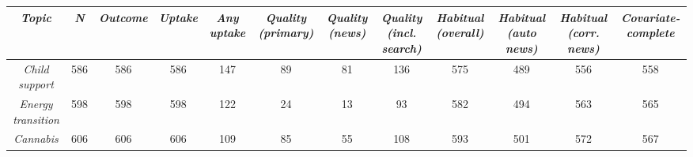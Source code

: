 \begin{tabular}{c c c c c c c c c c c c}
      \hline
      \textit{Topic} & \textit{N} & \textit{Outcome} & \textit{Uptake} & \textit{Any uptake} & \textit{Quality (primary)} & \textit{Quality (news)} & \textit{Quality (incl. search)} & \textit{Habitual (overall)} & \textit{Habitual (auto news)} & \textit{Habitual (corr. news)} & \textit{Covariate-complete} \\
      \hline
      \textit{Child support} & 586 & 586 & 586 & 147 & 89 & 81 & 136 & 575 & 489 & 556 & 558 \\
      \textit{Energy transition} & 598 & 598 & 598 & 122 & 24 & 13 & 93 & 582 & 494 & 563 & 565 \\
      \textit{Cannabis} & 606 & 606 & 606 & 109 & 85 & 55 & 108 & 593 & 501 & 572 & 567 \\
      \hline
    \end{tabular}
